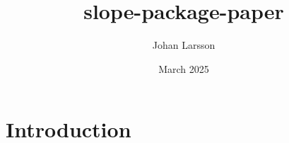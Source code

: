 \documentclass{article}
\title{slope-package-paper}
\author{Johan Larsson}
\date{March 2025}
\begin{document}
\maketitle

\section{Introduction}
\end{document}
